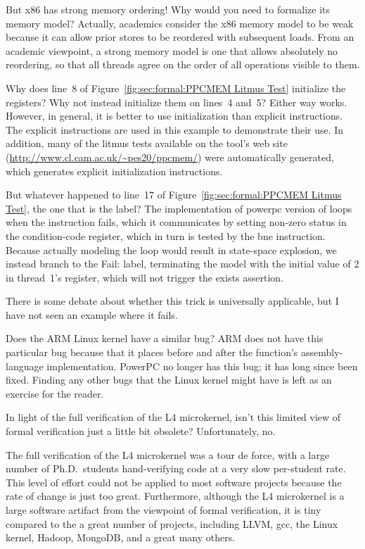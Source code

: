 \QuickQ{}
	But x86 has strong memory ordering!  Why would you need to
	formalize its memory model?
\QuickA{}
	Actually, academics consider the x86 memory model to be weak
	because it can allow prior stores to be reordered with
	subsequent loads.
	From an academic viewpoint, a strong memory model is one
	that allows absolutely no reordering, so that all threads
	agree on the order of all operations visible to them.

\QuickQ{}
	Why does line~8
	of Figure~\ref{fig:sec:formal:PPCMEM Litmus Test}
	initialize the registers?
	Why not instead initialize them on lines~4 and~5?
\QuickA{}
	Either way works.
	However, in general, it is better to use initialization than
	explicit instructions.
	The explicit instructions are used in this example to demonstrate
	their use.
	In addition, many of the litmus tests available on the tool's
	web site (\url{http://www.cl.cam.ac.uk/~pes20/ppcmem/}) were
	automatically generated, which generates explicit
	initialization instructions.

\QuickQ{}
	But whatever happened to line~17 of
	Figure~\ref{fig:sec:formal:PPCMEM Litmus Test},
	the one that is the  label?
\QuickA{}
	The implementation of powerpc version of 
	loops when the  instruction fails, which it communicates
	by setting non-zero status in the condition-code register,
	which in turn is tested by the bne instruction. Because actually
	modeling the loop would result in state-space explosion, we
	instead branch to the Fail: label, terminating the model with
	the initial value of 2 in thread~1's  register, which
	will not trigger the exists assertion.

	There is some debate about whether this trick is universally
	applicable, but I have not seen an example where it fails.

\QuickQ{}
	Does the ARM Linux kernel have a similar bug?
\QuickA{}
	ARM does not have this particular bug because that it places
	 before and after the 
	function's assembly-language implementation.
	PowerPC no longer has this bug; it has long since been fixed.
	Finding any other bugs that the Linux kernel might have is left
	as an exercise for the reader.

\QuickQ{}
	In light of the full verification of the L4 microkernel,
	isn't this limited view of formal verification just a little
	bit obsolete?
\QuickA{}
	Unfortunately, no.

	The full verification of the L4 microkernel was a tour de force,
	with a large number of Ph.D.~students hand-verifying code at a
	very slow per-student rate.
	This level of effort could not be applied to most software projects
	because the rate of change is just too great.
	Furthermore, although the L4 microkernel is a large software
	artifact from the viewpoint of formal verification, it is tiny
	compared to the a great number of projects, including LLVM,
	gcc, the Linux kernel, Hadoop, MongoDB, and a great many others.

